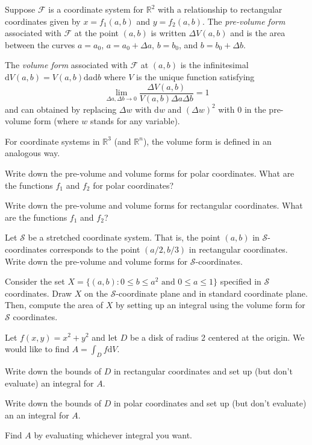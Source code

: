 \documentclass{problemset}
\newcommand{\R}{\mathbb{R}}
\renewcommand{\d}{\mathrm{d}}
\begin{document}
	\begin{definition}
		Suppose $\mathcal F$ is a coordinate system for $\R^2$ with a relationship
		to rectangular coordinates given by 
		$x=f_1(a,b)$ and $y=f_2(a,b)$.  The \emph{pre-volume form} associated with $\mathcal F$
		at the point $(a,b)$ is written $\Delta V(a,b)$ and is the area between the curves
		$a=a_0$, $a=a_0+\Delta a$, $b=b_0$, and $b=b_0+\Delta b$.

		The \emph{volume form} associated with $\mathcal F$ at $(a,b)$ is the infinitesimal 
		$\d V(a,b)=V(a,b)\d a\d b$ where $V$ is the unique function satisfying
		\[
			\lim_{\Delta a,\Delta b\to 0} \frac{\Delta V(a,b)}{V(a,b)\Delta a\Delta b} = 1
		\]
		and can obtained by replacing $\Delta w$ with $\d w$ and $(\Delta w)^2$ with $0$ in
		the pre-volume form (where $w$ stands for any variable).
	\end{definition}
	For coordinate systems in $\R^3$ (and $\R^n$), the volume form is defined in an analogous way.


	\question
	\begin{parts}
		\item Write down the pre-volume and volume forms for polar coordinates.  What are the functions
			$f_1$ and $f_2$ for polar coordinates?
		\item Write down the pre-volume and volume forms for rectangular coordinates.  What
			are the functions $f_1$ and $f_2$?
		\item Let $\mathcal S$ be a stretched coordinate system.  That is, the point $(a,b)$ in
			$\mathcal S$-coordinates corresponds to the point $(a/2, b/3)$ in rectangular 
			coordinates.  Write down the pre-volume and volume forms for $\mathcal S$-coordinates.
		\item Consider the set $X=\{(a,b): 0\leq b\leq a^2\text{ and }0\leq a\leq 1\}$ specified in $\mathcal S$ coordinates.
			Draw $X$ on the $\mathcal S$-coordinate plane and in standard coordinate plane.  Then, compute
			the area of $X$ by setting up an integral using the volume form for $\mathcal S$ coordinates.
	\end{parts}

	\question
	Let $f(x,y)=x^2+y^2$ and let $D$ be a disk of radius 2 centered at the origin.  We would like to
	find $A=\displaystyle \int_D f\d V$.
	\begin{parts}
		\item Write down the bounds of $D$ in rectangular coordinates and set up (but don't evaluate)
			an integral for $A$.
		\item Write down the bounds of $D$ in polar coordinates and set up (but don't evaluate) an 
			an integral for $A$.
		\item Find $A$ by evaluating whichever integral you want.
	\end{parts}
\end{document}
